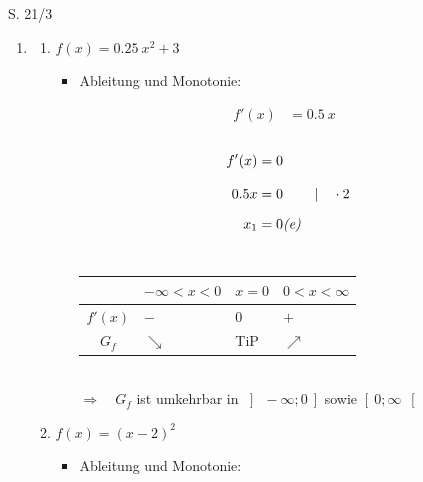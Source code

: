 \begin{Exercise}{S. 21/3}{}
    \begin{enumerate}
        \item [3.]\begin{enumerate}[label=\alph*)]
            \item[a)] {
                $f(x) = \SI{0.25}{} x^{2} + 3$\\[-2.0ex]
                \begin{itemize}[leftmargin=*]
                    \item Ableitung und Monotonie: \\{
                        \vspace{-2.0ex}
                        \begin{align*}
                            f'(x) &= \SI{0.5}{} x &&
                        \end{align*}\\[-2.0ex]
                        \begin{align*}
                            f'(x) &= 0 \\[2.0ex]
                            \SI{0.5}{} x &= 0 &&| \quad \cdot 2\\[1.5ex]
                            x_{1} &= 0 \text{\textit{(e)}} &&
                        \end{align*}\\[-2.0ex]
                        \begin{tabularx}{0.95\linewidth}{c|X|X|X}
                            & $-\infty < x < 0$ & $x = 0$ & $0 < x < \infty$ \\ \hline
                            $f'(x)$ & $-$ & $0$ & $+$ \\ \hline
                            $G_{f}$ & $\searrow$ & TiP & $\nearrow$ \\              
                        \end{tabularx}\\[4.0ex]
                        $\Rightarrow \quad G_{f}$ ist umkehrbar in $\left] \ -\infty; 0 \ \right]$ sowie $\left[ \ 0; \infty \ \right[$\\[-2.0ex]
                        }
                \end{itemize}
                }
            \item[b)] {
                $f(x) = \left(x-2\right)^2$\\[-2.0ex]
                \begin{itemize}[leftmargin=*]
                    \item Ableitung und Monotonie: \\{
}
\end{itemize}}
\end{enumerate}
\end{enumerate}
\end{Exercise}
